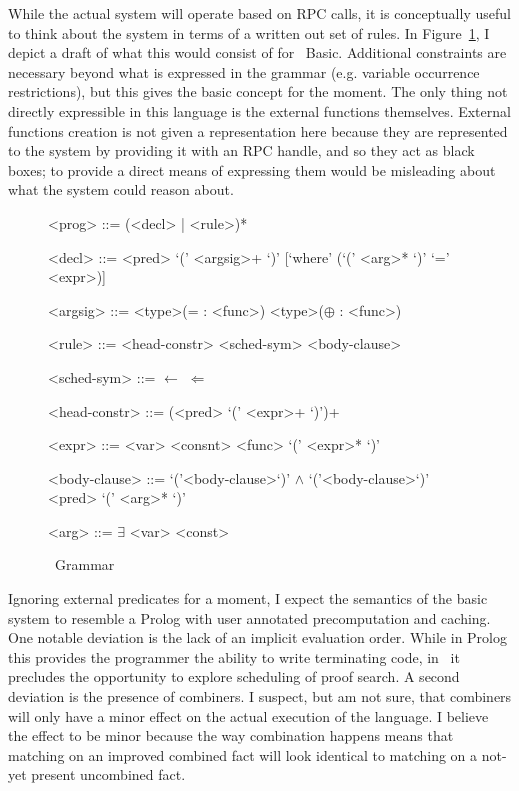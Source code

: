 While the actual system will operate based on RPC calls, it is conceptually useful to think about the system in terms of a written out set of rules.
In Figure~\ref{fig:holmesGrammar}, I depict a draft of what this would consist of for \sysname\ Basic.
Additional constraints are necessary beyond what is expressed in the grammar (e.g. variable occurrence restrictions), but this gives the basic concept for the moment.
The only thing not directly expressible in this language is the external functions themselves.
External functions creation is not given a representation here because they are represented to the system by providing it with an RPC handle, and so they act as black boxes;
to provide a direct means of expressing them would be misleading about what the system could reason about.

\begin{figure}
\begin{grammar}

<prog> ::= (<decl> | <rule>)*

<decl> ::= <pred> `(' <argsig>+ `)' [`where' (`(' <arg>* `)' `=' <expr>)]

<argsig>
::=  <type>(= : <func>)
\alt <type>($\oplus$ : <func>)

<rule> ::= <head-constr> <sched-sym> <body-clause>

<sched-sym> ::= $\leftarrow$
\alt $\Leftarrow$

<head-constr> ::= (<pred> `(' <expr>+ `)')+

<expr> ::= <var>
\alt <consnt>
\alt <func> `(' <expr>* `)'

<body-clause>
::=  `('<body-clause>`)' $\wedge$ `('<body-clause>`)'
\alt <pred> `(' <arg>* `)'

<arg> ::= $\exists$ \alt <var> \alt <const>
\end{grammar}
\label{fig:holmesGrammar}
\caption{\sysname\ Grammar}
\end{figure}

Ignoring external predicates for a moment, I expect the semantics of the basic system to resemble a Prolog with user annotated precomputation and caching.
One notable deviation is the lack of an implicit evaluation order.
While in Prolog this provides the programmer the ability to write terminating code, in \sysname\ it precludes the opportunity to explore scheduling of proof search.
A second deviation is the presence of combiners.
I suspect, but am not sure, that combiners will only have a minor effect on the actual execution of the language.
I believe the effect to be minor because the way combination happens means that matching on an improved combined fact will look identical to matching on a not-yet present uncombined fact.

